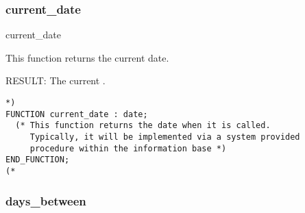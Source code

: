 \documentclass{article}
\begin{document}
\subsubsection{current\_date}

\begin{Mnamedesc}{current_date}
\begin{Mdesctext}
    This function returns the current date.
\end{Mdesctext}

\begin{Ipars}

\item[RESULT:] The current .
\end{Ipars}

\begin{Mexp}
\begin{verbatim}
*)
FUNCTION current_date : date;
  (* This function returns the date when it is called. 
     Typically, it will be implemented via a system provided 
     procedure within the information base *) 
END_FUNCTION;
(*
\end{verbatim}
\end{Mexp}
\end{Mnamedesc}

\subsubsection{days\_between}
\end{document}
